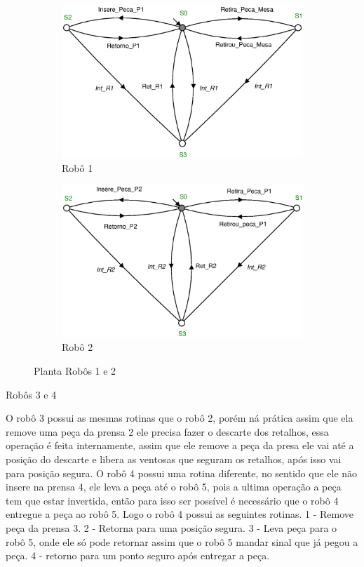 \begin{figure}[H]%
  \centering
  \begin{subfigure}[b]{0.45\textwidth}
      \centering
      \includegraphics[width=\textwidth]{imagens/Robo_1.eps}
      \caption{Robô 1}
      \label{fig:r1}
  \end{subfigure}
  \hfill
  \begin{subfigure}[b]{0.45\textwidth}
      \centering
      \includegraphics[width=\textwidth]{imagens/Robo_2.eps}
      \caption{Robô 2}
      \label{fig:r2}
  \end{subfigure}
  \caption{Planta Robôs 1 e 2}
  \label{fig:robo12}
\end{figure}

Robôs 3 e 4

O robô 3 possui as mesmas rotinas que o robô 2, porém ná prática assim que ela remove uma peça da prensa 2 ele precisa fazer o descarte dos retalhos, essa operação é feita internamente, assim que ele remove a peça da presa ele vai até a posição do descarte e libera as ventosas que seguram os retalhos, após isso vai para posição segura. 
O robô 4 possui uma rotina diferente, no sentido que ele não insere na prensa 4, ele leva a peça até o robô 5, pois a ultima operação a peça tem que estar invertida, então para isso ser possível é necessário que o robô 4 entregue a peça ao robô 5. Logo o robô 4 possui as seguintes rotinas. 
1 - Remove peça da prensa 3. 
2 - Retorna para uma posição segura. 
3 - Leva peça para o robô 5, onde ele só pode retornar assim que o robô 5 mandar sinal que já pegou a peça. 
4 - retorno para um ponto seguro após entregar a peça. 

